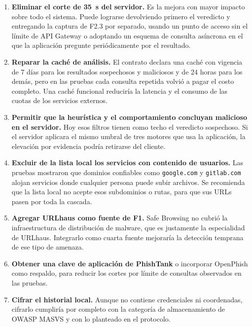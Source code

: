 \begin{enumerate}
	\item \textbf{Eliminar el corte de 35~s del servidor.} Es la mejora con mayor impacto sobre todo el sistema. Puede lograrse devolviendo primero el veredicto y entregando la captura de F2.3 por separado, usando un punto de acceso sin el límite de API Gateway o adoptando un esquema de consulta asíncrona en el que la aplicación pregunte periódicamente por el resultado.

	\item \textbf{Reparar la caché de análisis.} El contrato declara una caché con vigencia de 7 días para los resultados sospechosos y maliciosos y de 24 horas para los demás, pero en las pruebas cada consulta repetida volvió a pagar el costo completo. Una caché funcional reduciría la latencia y el consumo de las cuotas de los servicios externos.

	\item \textbf{Permitir que la heurística y el comportamiento concluyan malicioso en el servidor.} Hoy esos filtros tienen como techo el veredicto sospechoso. Si el servidor aplicara el mismo umbral de tres motores que usa la aplicación, la elevación por evidencia podría retirarse del cliente.

	\item \textbf{Excluir de la lista local los servicios con contenido de usuarios.} Las pruebas mostraron que dominios confiables como \texttt{google.com} y \texttt{gitlab.com} alojan servicios donde cualquier persona puede subir archivos. Se recomienda que la lista local no acepte esos subdominios o rutas, para que sus URLs pasen por toda la cascada.

	\item \textbf{Agregar URLhaus como fuente de F1.} Safe Browsing no cubrió la infraestructura de distribución de malware, que es justamente la especialidad de URLhaus. Integrarlo como cuarta fuente mejoraría la detección temprana de ese tipo de amenaza.

	\item \textbf{Obtener una clave de aplicación de PhishTank} o incorporar OpenPhish como respaldo, para reducir los cortes por límite de consultas observados en las pruebas.

	\item \textbf{Cifrar el historial local.} Aunque no contiene credenciales ni coordenadas, cifrarlo cumpliría por completo con la categoría de almacenamiento de OWASP MASVS y con lo planteado en el protocolo.


\end{enumerate}
